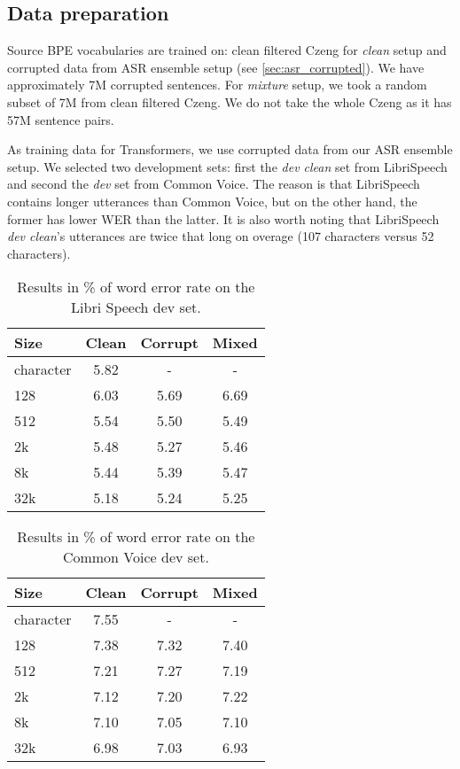 \subsection{Data preparation}
Source BPE vocabularies are trained on: clean filtered Czeng for \textit{clean} setup and corrupted data from ASR ensemble setup (see \cref{sec:asr_corrupted}). We have approximately 7M corrupted sentences. For \textit{mixture} setup, we took a random subset of 7M from clean filtered Czeng. We do not take the whole Czeng as it has 57M sentence pairs. 

As training data for Transformers, we use corrupted data from our ASR ensemble setup. We selected two development sets: first the \textit{dev clean} set from LibriSpeech and second the \textit{dev} set from Common Voice. The reason is that LibriSpeech contains longer utterances than Common Voice, but on the other hand, the former has lower WER than the latter. It is also worth noting that LibriSpeech \textit{dev clean}'s utterances are twice that long on overage (107 characters versus 52 characters).


\begin{table}[p]
	\centering
	\begin{tabular}{l|ccc}
		\bf Size & \bf Clean & \bf Corrupt & \bf Mixed \\
		\hline
		character &  5.82  &  -  &  -  \\
		128 &  6.03  &  5.69  &  6.69  \\
		512 &    5.54  &  5.50   &  5.49 \\
		2k &  5.48  & 5.27  & 5.46  \\
		8k &  5.44  &   5.39 & 5.47  \\
		32k &  5.18  & 5.24  &  5.25 \\
		
	\end{tabular}
	\caption{Results in \% of word error rate on the Libri Speech dev set.}
	\label{tab:results_vocabularies_libri}
\end{table}

\begin{table}[p]
	\centering
	\begin{tabular}{l|ccc}
		\bf Size & \bf Clean & \bf Corrupt & \bf Mixed \\
		\hline
		character &  7.55  &  -  &  -  \\
		128 & 7.38   &  7.32  & 7.40  \\
		512 &  7.21  & 7.27   & 7.19  \\
		2k & 7.12   & 7.20 & 7.22  \\
		8k &  7.10  & 7.05  & 7.10  \\
		32k &  6.98  & 7.03  &  6.93 \\
		
	\end{tabular}
	\caption{Results in \% of word error rate on the Common Voice dev set.}
	\label{tab:results_vocabularies_common}
\end{table}

